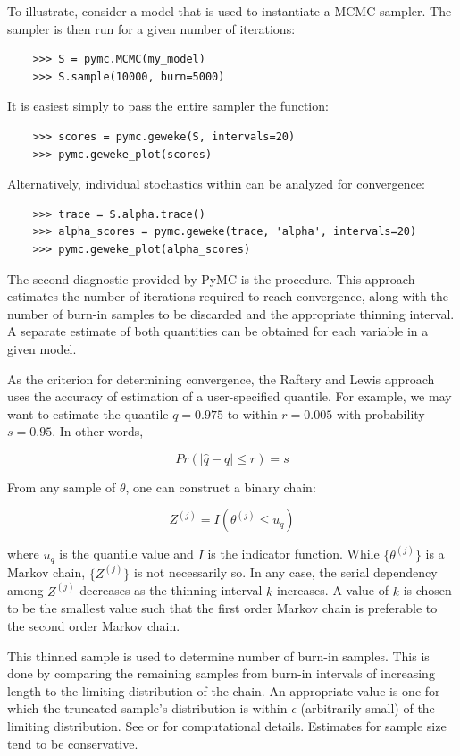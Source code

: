 To illustrate, consider a model  that is used to instantiate a MCMC sampler. The sampler is then run for a given number of iterations:
\begin{verbatim}
	>>> S = pymc.MCMC(my_model)
	>>> S.sample(10000, burn=5000)
\end{verbatim}
It is easiest simply to pass the entire sampler  the  function:
\begin{verbatim}
	>>> scores = pymc.geweke(S, intervals=20)
	>>> pymc.geweke_plot(scores)
\end{verbatim}
Alternatively, individual stochastics within  can be analyzed for convergence:
\begin{verbatim}
	>>> trace = S.alpha.trace()
	>>> alpha_scores = pymc.geweke(trace, 'alpha', intervals=20)
	>>> pymc.geweke_plot(alpha_scores)
\end{verbatim}

The second diagnostic provided by PyMC is the \citet{raftery} procedure. This approach estimates the number of iterations required to reach convergence, along with the number of burn-in samples to be discarded and the appropriate thinning interval. A separate estimate of both quantities can be obtained for each variable in a given model.

As the criterion for determining convergence, the Raftery and Lewis approach uses the accuracy of estimation of a user-specified quantile. For example, we may want to estimate the quantile $q=0.975$ to within $r=0.005$ with probability $s=0.95$. In other words,

\begin{equation}
	Pr(|\hat{q}-q| \le r) = s
\end{equation}

From any sample of $\theta$, one can construct a binary chain:

\begin{equation}
	Z^{(j)} = I(\theta^{(j)} \le u_q)
\end{equation}

where $u_q$ is the quantile value and $I$ is the indicator function. While $\{\theta^{(j)}\}$ is a Markov chain, $\{Z^{(j)}\}$ is not necessarily so. In any case, the serial dependency among $Z^{(j)}$ decreases as the thinning interval $k$ increases. A value of $k$ is chosen to be the smallest value such that the first order Markov chain is preferable to the second order Markov chain. 

This thinned sample is used to determine number of burn-in samples. This is done by comparing the remaining samples from burn-in intervals of increasing length to the limiting distribution of the chain. An appropriate value is one for which the truncated sample's distribution is within $\epsilon$ (arbitrarily small) of the limiting distribution. See \citet{raftery} or \citet{Gamerman:1997tb} for computational details. Estimates for sample size tend to be conservative.

